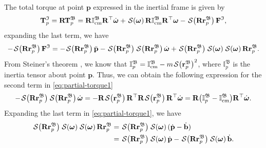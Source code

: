 The total torque at point $\mathbf{p}$ expressed in the inertial frame is given by
\begin{align}
    \mathbf{T}^\mathfrak{I}_p = \mathbf{R}\mathbf{T}^\mathfrak{B}_p = \mathbf{R}\mathbb{I}^\mathfrak{B}_\text{cm}\mathbf{R}^\top\dot{\boldsymbol{\omega}} + \SL[\boldsymbol{\omega}]\mathbf{R}\mathbb{I}^\mathfrak{B}_\text{cm}\mathbf{R}^\top\boldsymbol{\omega} - \SL[\mathbf{R}\mathbf{r}^\mathfrak{B}_p]\mathbf{F}^\mathfrak{I}, \label{eq:torque-modelling}
\end{align}
expanding the last term, we have
\begin{align}
    - \SL[\mathbf{R}\mathbf{r}^\mathfrak{B}_p]\mathbf{F}^\mathfrak{I} = 
    - \SL[\mathbf{R}\mathbf{r}^\mathfrak{B}_p]\ddot{\mathbf{p}} - \SL[\mathbf{R}\mathbf{r}^\mathfrak{B}_p]\SL[\mathbf{R}\mathbf{r}_p^\mathfrak{B}]\dot{\boldsymbol{\omega}} + \SL[\mathbf{R}\mathbf{r}^\mathfrak{B}_p]\SL[\boldsymbol{\omega}]\SL[\boldsymbol{\omega}]\mathbf{R}\mathbf{r}_p^\mathfrak{B}. \label{eq:partial-torque1}
\end{align}
From Steiner's theorem \citep{lemos2018analytical}, we know that $\mathbb{I}^\mathfrak{B}_p = \mathbb{I}^\mathfrak{B}_\text{cm} - m\SL[\mathbf{r}_p^\mathfrak{B}]^2$, where $\mathbb{I}^\mathfrak{B}_p$ is the inertia tensor about point $\mathbf{p}$. Thus, we can obtain the following expression for the second term in \eqref{eq:partial-torque1}
\begin{align}
    - \SL[\mathbf{R}\mathbf{r}^\mathfrak{B}_p]\SL[\mathbf{R}\mathbf{r}_p^\mathfrak{B}]\dot{\boldsymbol{\omega}} = - \mathbf{R}\SL[\mathbf{r}^\mathfrak{B}_p]\mathbf{R}^\top\mathbf{R}\SL[\mathbf{r}_p^\mathfrak{B}]\mathbf{R}^\top\dot{\boldsymbol{\omega}} = \mathbf{R}\bigl(\mathbb{I}^\mathfrak{B}_p - \mathbb{I}^\mathfrak{B}_\text{cm}\bigr)\mathbf{R}^\top\dot{\boldsymbol{\omega}}.
    \label{eq:partial-torque2}
\end{align}
Expanding the last term in \eqref{eq:partial-torque1}, we have
\begin{align}
    \begin{split}
        \SL[\mathbf{R}\mathbf{r}^\mathfrak{B}_p]\SL[\boldsymbol{\omega}]\SL[\boldsymbol{\omega}]\mathbf{R}\mathbf{r}_p^\mathfrak{B} &= \SL[\mathbf{R}\mathbf{r}^\mathfrak{B}_p]\SL[\boldsymbol{\omega}](\dot{\mathbf{p}} - \dot{\mathbf{b}})\\
        &= \SL[\mathbf{R}\mathbf{r}^\mathfrak{B}_p]\SL[\boldsymbol{\omega}]\dot{\mathbf{p}} - \SL[\mathbf{R}\mathbf{r}^\mathfrak{B}_p]\SL[\boldsymbol{\omega}]\dot{\mathbf{b}}.
    \end{split}
\end{align}
